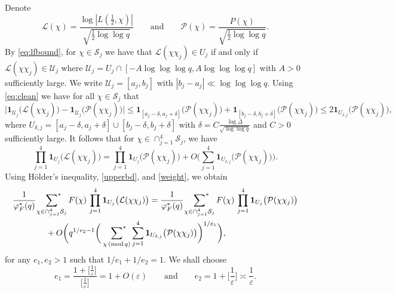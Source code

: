 \documentclass[12pt, reqno]{amsart}
\renewcommand{\pmod}[1]{\,(\mathrm{mod}\,#1)}
\numberwithin{equation}{section}
\numberwithin{theorem}{section}
\numberwithin{equation}{section}
\def\sumstar{\sideset{}{^*}\sum}
\begin{document}
Denote $$\mathcal L(\chi)= \frac{\log |L(\frac12,\chi)|}{\sqrt{\frac12 \log \log q}}\qquad \text{and}\qquad \mathcal P(\chi)=\frac{P(\chi)}{\sqrt{\frac12\log \log q}}.$$ 
By \eqref{eq:lfbound}, for $\chi \in \mathcal  S_j$ we have that $\mathcal L(\chi\chi_j) \in U_j$ if and only if $\mathcal L(\chi\chi_j) \in \mathcal U_j$ where $\mathcal U_j=U_j \cap [-A \log \log \log q, A \log \log \log q]$ with $A>0$ sufficiently large. We write $\mathcal U_j=[a_j,b_j]$ with $|b_j-a_j| \ll \log \log \log q$.
Using \eqref{eq:clean} we have for  
all $\chi \in \mathcal{S}_j$ that 
\[
\Big|\mathbf{1}_{\mathcal U_j}\big(\mathcal L(\chi\chi_j)\big)-\mathbf{1}_{\mathcal U_j}\big(\mathcal P(\chi\chi_j)\big)\Big|\leq \mathbf{1}_{[a_j-\delta,a_j+\delta]}\big(\mathcal P(\chi\chi_j)\big) +\mathbf{1}_{[b_j-\delta,b_j+\delta]}\big(\mathcal P(\chi\chi_j)\big) \leq 2\mathbf{1}_{U_{\delta,j}}\big(\mathcal P(\chi\chi_j)\big),
\]
where $U_{\delta,j}=[a_j-\delta,a_j+\delta] \cup  [b_j-\delta,b_j+\delta]$ with $\delta=C \frac{\log\Delta}{\sqrt{\log \log q}}$ and $C>0$ sufficiently large. It follows that for $\chi \in \cap_{j=1}^{4} \mathcal{S}_j$, we have
\[
\prod_{j=1}^{4}\mathbf{1}_{U_j}\big(\mathcal L(\chi\chi_j)\big)=\prod_{j=1}^{4}\mathbf{1}_{U_j}\big(\mathcal P(\chi\chi_j)\big)+O\Big(\sum_{j=1}^4\mathbf{1}_{U_{\delta,j}}\big(\mathcal P(\chi\chi_j)\big)\Big).
\]
Using H\"older's inequality, \eqref{upperbd}, and \eqref{weight}, we obtain
\begin{equation} \label{eq:ltop}
\begin{split}
&\frac{1}{\varphi_F^{*}(q)}\ \sumstar_{\chi \in \cap_{j=1}^{4} \mathcal S_j} F(\chi) \, \prod_{j=1}^{4}\mathbf{1}_{U_j}\big(\mathcal L(\chi\chi_j)\big)=\frac{1}{\varphi_F^{*}(q)}\ \sumstar_{\chi \in \cap_{j=1}^{4} \mathcal S_j} F(\chi) \, \prod_{j=1}^{4}\mathbf{1}_{U_j}\big(\mathcal P(\chi\chi_j)\big) 
\\
&\qquad \qquad +O\bigg(q^{1/e_2-1} \bigg(\ \,\sumstar_{\chi \pmod q} \sum_{j=1}^4\mathbf{1}_{U_{\delta,j}}\big(\mathcal P(\chi\chi_j)\big) \bigg)^{1/e_1} \bigg),
\end{split}
\end{equation}
for any $e_1,e_2>1$ such that $1/e_1+1/e_2=1$. We shall choose 
\[
e_1=\frac{1+\big[\frac{1}{\varepsilon}\big]}{\big[\frac{1}{\varepsilon}\big]}=1+O(\varepsilon)\qquad\text{and}\qquad e_2=1+\Big[\frac{1}{\varepsilon}\Big]\asymp \frac{1}{\varepsilon}.
\]
\end{document}
